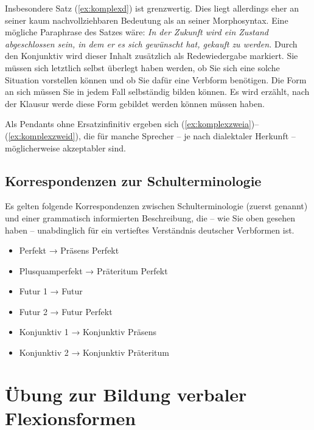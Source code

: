 Insbesondere Satz (\ref{ex:komplexd}) ist grenzwertig.
Dies liegt allerdings eher an seiner kaum nachvollziehbaren Bedeutung als an seiner Morphosyntax.
Eine mögliche Paraphrase des Satzes wäre:
\textit{In der Zukunft wird ein Zustand abgeschlossen sein, in dem er es sich gewünscht hat, gekauft zu werden.}
Durch den Konjunktiv wird dieser Inhalt zusätzlich als Redewiedergabe markiert.
Sie müssen sich letztlich selbst überlegt haben werden, ob Sie sich eine solche Situation vorstellen können und ob Sie dafür eine Verbform benötigen.
Die Form an sich müssen Sie in jedem Fall selbständig bilden können.
Es wird erzählt, nach der Klausur werde diese Form gebildet werden können müssen haben.

Als Pendants ohne Ersatzinfinitiv ergeben sich (\ref{ex:komplexzweia})--(\ref{ex:komplexzweid}), die für manche Sprecher -- je nach dialektaler Herkunft -- möglicherweise akzeptabler sind.

\begin{exe}
\end{exe}

\subsection{Korrespondenzen zur Schulterminologie}

Es gelten folgende Korrespondenzen zwischen Schulterminologie (zuerst genannt) und einer grammatisch informierten Beschreibung, die -- wie Sie oben gesehen haben -- unabdinglich für ein vertieftes Verständnis deutscher Verbformen ist.

\begin{itemize}\Lf
  \item Perfekt → Präsens Perfekt
  \item Plusquamperfekt → Präteritum Perfekt
  \item Futur 1 → Futur
  \item Futur 2 → Futur Perfekt
  \item Konjunktiv 1 → Konjunktiv Präsens
  \item Konjunktiv 2 → Konjunktiv Präteritum
\end{itemize}

\newpage

\section{Übung zur Bildung verbaler Flexionsformen}


